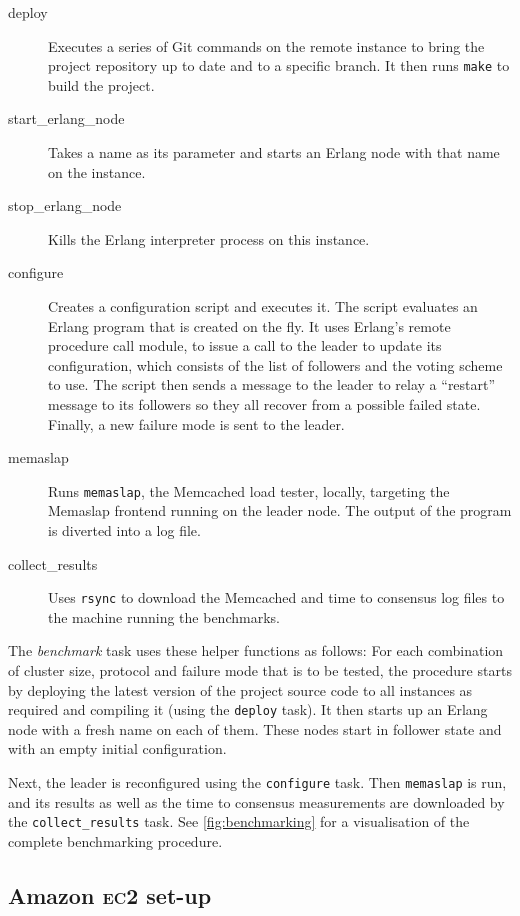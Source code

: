 \documentclass[12pt,chapterprefix=true,toc=bibliography,numbers=noendperiod,
               footnotes=multiple,twoside]{scrreprt}
\newcommand{\ECC}[0]{\textsc{ec}2 }
\begin{document}
\begin{description}
    \item[deploy] Executes a series of Git commands on the remote instance to bring the project repository up to date and to a specific branch. It then runs \texttt{make} to build the project.
    \item[start\_erlang\_node] Takes a name as its parameter and starts an Erlang node with that name on the instance.
    \item[stop\_erlang\_node] Kills the Erlang interpreter process on this instance.
    \item[configure] Creates a configuration script and executes it. The script evaluates an Erlang program that is created on the fly. It uses Erlang's remote procedure call module, to issue a call to the leader to update its configuration, which consists of the list of followers and the voting scheme to use. The script then sends a message to the leader to relay a \enquote{restart} message to its followers so they all recover from a possible failed state. Finally, a new failure mode is sent to the leader.
    \item[memaslap] Runs \texttt{memaslap}, the Memcached load tester, locally, targeting the Memaslap frontend running on the leader node. The output of the program is diverted into a log file.
    \item[collect\_results] Uses \texttt{rsync} to download the Memcached and time to consensus log files to the machine running the benchmarks.
\end{description}

The \textit{benchmark} task uses these helper functions as follows: For each combination of cluster size, protocol and failure mode that is to be tested, the procedure starts by deploying the latest version of the project source code to all instances as required and compiling it (using the \texttt{deploy} task). It then starts up an Erlang node with a fresh name on each of them. These nodes start in follower state and with an empty initial configuration.

Next, the leader is reconfigured using the \texttt{configure} task. Then \texttt{memaslap} is run, and its results as well as the time to consensus measurements are downloaded by the \texttt{collect\_results} task. See \cref{fig:benchmarking} for a visualisation of the complete benchmarking procedure.

\subsection[Amazon EC2 set-up]{Amazon \ECC set-up}
\end{document}
